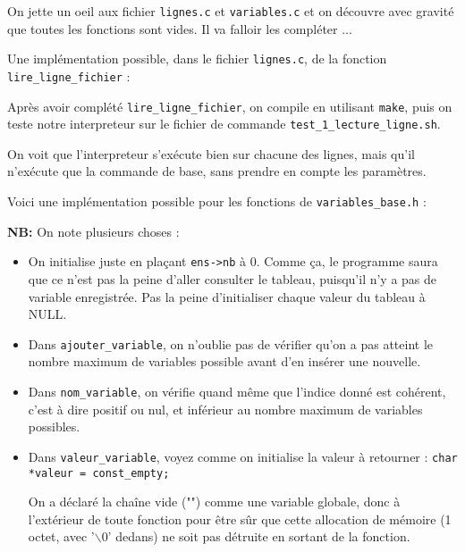 \documentclass[10pt]{article}
\begin{document}
\begin{enumerate}[label=\textbf{[\alph*]}]
  \setlength\itemsep{1em}

\item On jette un oeil aux fichier \texttt{lignes.c} et
  \texttt{variables.c} et on découvre avec gravité que toutes les
  fonctions sont vides. Il va falloir les compléter ...

\item Une implémentation possible, dans le fichier \texttt{lignes.c},
  de la fonction \texttt{lire\_ligne\_fichier} :

  

\item Après avoir complété \texttt{lire\_ligne\_fichier}, on compile
  en utilisant \texttt{make}, puis on teste notre interpreteur sur le
  fichier de commande \texttt{test\_1\_lecture\_ligne.sh}.
  \vspace{0.2cm}

  On voit que l'interpreteur s'exécute bien sur chacune des lignes,
  mais qu'il n'exécute que la commande de base, sans prendre en compte
  les paramètres.
  \vspace{0.2cm}
  \newpage

\item Voici une implémentation possible pour les fonctions de
  \texttt{variables\_base.h} :

  

  \textbf{NB:} On note plusieurs choses :
  \begin{itemize}
  \item On initialise juste en plaçant \texttt{ens->nb} à 0. Comme ça,
    le programme saura que ce n'est pas la peine d'aller consulter le
    tableau, puisqu'il n'y a pas de variable enregistrée. Pas la peine
    d'initialiser chaque valeur du tableau à NULL.
  \item Dans \texttt{ajouter\_variable}, on n'oublie pas de vérifier
    qu'on a pas atteint le nombre maximum de variables possible avant
    d'en insérer une nouvelle.
  \item Dans \texttt{nom\_variable}, on vérifie quand même que
    l'indice donné est cohérent, c'est à dire positif ou nul, et
    inférieur au nombre maximum de variables possibles.
  \item Dans \texttt{valeur\_variable}, voyez comme on initialise la
    valeur à retourner : \texttt{char *valeur = const\_empty;}

    On a déclaré la chaîne vide ("") comme une variable globale, donc
    à l'extérieur de toute fonction pour être sûr que cette allocation
    de mémoire (1 octet, avec '$\backslash$0' dedans) ne soit pas détruite en
    sortant de la fonction.
  \end{itemize}


\end{enumerate}
\end{document}
